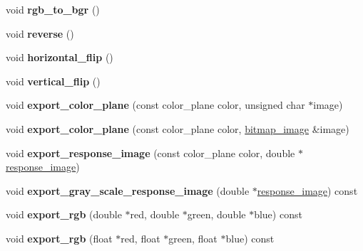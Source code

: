 \begin{DoxyCompactItemize}
\mbox{\label{classbitmap__image_a7fdb2abbe49997ae46a874b211a0b04d}} 
void {\bfseries rgb\+\_\+to\+\_\+bgr} ()
\item 
\mbox{\label{classbitmap__image_a59b4a498dba88a13a564c3ec6d47b92a}} 
void {\bfseries reverse} ()
\item 
\mbox{\label{classbitmap__image_a1aac6ed9e42764154e3f487c51ed38ea}} 
void {\bfseries horizontal\+\_\+flip} ()
\item 
\mbox{\label{classbitmap__image_a54d5d7c91351f8b6c77f7a68118259fe}} 
void {\bfseries vertical\+\_\+flip} ()
\item 
\mbox{\label{classbitmap__image_a9bfafd98534e757abbd37d89442c9971}} 
void {\bfseries export\+\_\+color\+\_\+plane} (const color\+\_\+plane color, unsigned char $\ast$image)
\item 
\mbox{\label{classbitmap__image_a2648afc1b163ecd5e6c0217ec2f6f3bd}} 
void {\bfseries export\+\_\+color\+\_\+plane} (const color\+\_\+plane color, \mbox{\hyperlink{classbitmap__image}{bitmap\+\_\+image}} \&image)
\item 
\mbox{\label{classbitmap__image_ad19a6ec3a27f89c06346157cc668cb26}} 
void {\bfseries export\+\_\+response\+\_\+image} (const color\+\_\+plane color, double $\ast$\mbox{\hyperlink{classresponse__image}{response\+\_\+image}})
\item 
\mbox{\label{classbitmap__image_afc49c7cc5403ab81fef138c562ee3124}} 
void {\bfseries export\+\_\+gray\+\_\+scale\+\_\+response\+\_\+image} (double $\ast$\mbox{\hyperlink{classresponse__image}{response\+\_\+image}}) const
\item 
\mbox{\label{classbitmap__image_a8a4445e1474bcfde41cc49159bd9f0d1}} 
void {\bfseries export\+\_\+rgb} (double $\ast$red, double $\ast$green, double $\ast$blue) const
\item 
\mbox{\label{classbitmap__image_afceda9b406c031b7585ccfa939aad8af}} 
void {\bfseries export\+\_\+rgb} (float $\ast$red, float $\ast$green, float $\ast$blue) const

\end{DoxyCompactItemize}
